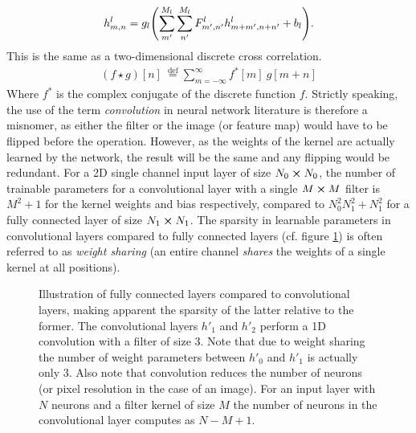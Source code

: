 \begin{align}
    h^l_{m,n} = g_l\qty(\sum_{m'}^{M_l}\sum_{n'}^{M_l}F_{m',n'}^l h_{m+m',n+n'}^l+b_l).
    \label{eq:2dconv}
\end{align}
This is the same as a two-dimensional discrete cross correlation.
\begin{align}
    (f \star g)[n]\ \stackrel{\mathrm{def}}{=} \sum_{m=-\infty}^{\infty} f^*[m]\ g[m+n]
\end{align}
Where $f^*$ is the complex conjugate of the discrete function $f$. Strictly speaking, the use of the term \emph{convolution} in neural network literature is therefore a misnomer, as either the filter or the image (or feature map) would have to be flipped before the operation. However, as the weights of the kernel are actually learned by the network, the result will be the same and any flipping would be redundant. 
For a 2D single channel input layer of size $N_0\cp N_0$, the number of trainable parameters for a convolutional layer with a single $M\cp M$ filter is $M^2 + 1$ for the kernel weights and bias respectively, compared to $N_0^2N_1^2+N_1^2$ for a fully connected layer of size $N_1\cp N_1$. The sparsity in learnable parameters in convolutional layers compared to fully connected layers (cf. figure \ref{fig:convolutional}) is often referred to as \emph{weight sharing} (an entire channel \emph{shares} the weights of a single kernel at all positions).
\begin{figure}[H]
    \centering
{}
\caption[Illustration of convolutional layers]{Illustration of fully connected layers compared to convolutional layers, making apparent the sparsity of the latter relative to the former. The convolutional layers $h'_1$ and $h'_2$ perform a 1D convolution with a filter of size $3$. Note that due to weight sharing the number of weight parameters between $h'_0$ and $h'_1$ is actually only $3$. Also note that convolution reduces the number of neurons (or pixel resolution in the case of an image). For an input layer with $N$ neurons and a filter kernel of size $M$ the number of neurons in the convolutional layer computes as $N-M+1$. }\label{fig:convolutional}
\end{figure}\noindent
